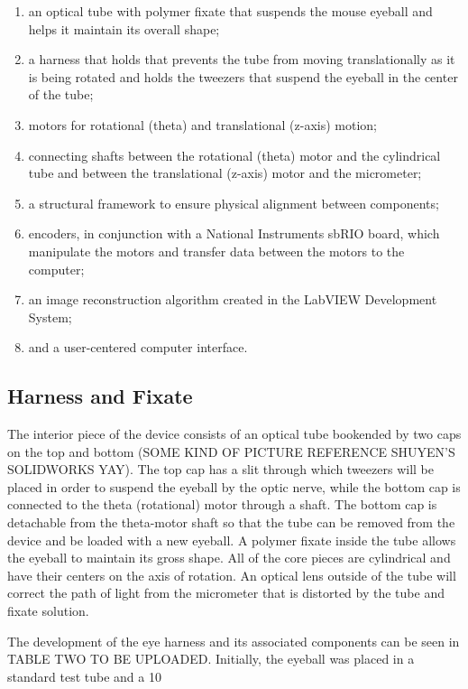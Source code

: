 \documentclass{article}
\begin{document}
\begin{enumerate}
 \item an optical tube with polymer fixate that suspends the mouse eyeball and helps it maintain its overall shape; 
\item a harness that holds that prevents the tube from moving translationally as it is being rotated and holds the tweezers that suspend the eyeball in the center of the tube;
\item motors for rotational (theta) and translational (z-axis) motion; 
\item connecting shafts between the rotational (theta) motor and the cylindrical tube and between the translational (z-axis) motor and the micrometer;
\item a structural framework to ensure physical alignment between components; 
\item encoders, in conjunction with a National Instruments sbRIO board, which manipulate the motors and transfer data between the motors to the computer;  
\item an image reconstruction algorithm created in the LabVIEW Development System;
\item and a user-centered computer interface. 
\end{enumerate}

\subsection{Harness and Fixate}
\label{sec:harness}
	
The interior piece of the device consists of an optical tube bookended by two caps on the top and bottom (SOME KIND OF PICTURE REFERENCE SHUYEN’S SOLIDWORKS YAY).  The top cap has a slit through which tweezers will be placed in order to suspend the eyeball by the optic nerve, while the bottom cap is connected to the theta (rotational) motor through a shaft. The bottom cap is detachable from the theta-motor shaft so that the tube can be removed from the device and be loaded with a new eyeball. A polymer fixate inside the tube allows the eyeball to maintain its gross shape.  All of the core pieces are cylindrical and have their centers on the axis of rotation. An optical lens outside of the tube will correct the path of light from the micrometer that is distorted by the tube and fixate solution.
	
The development of the eye harness and its associated components can be seen in TABLE TWO TO BE UPLOADED. Initially, the eyeball was placed in a standard test tube and a 10%
	
\end{document}
